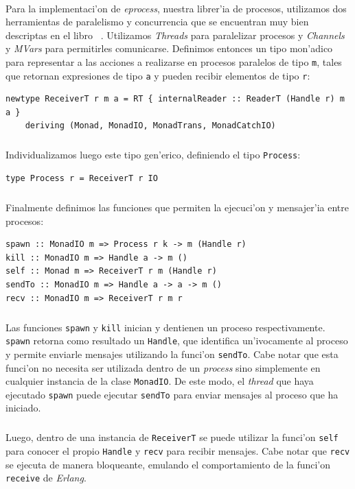 \documentclass[a4paper]{article}
\begin{document}
\paragraph{}Para la implementaci'on de \textsl{eprocess}, nuestra librer'ia de procesos, utilizamos dos herramientas de paralelismo y concurrencia que se encuentran muy bien descriptas en el libro ~\cite{realworldhaskell}.  Utilizamos \textsl{Threads} para paralelizar procesos y \textsl{Channels} y \textsl{MVars} para permitirles comunicarse.  Definimos entonces un tipo mon'adico para representar a las acciones a realizarse en procesos paralelos de tipo \texttt{m}, tales que retornan expresiones de tipo \texttt{a} y pueden recibir elementos de tipo \texttt{r}:
\begin{center}\begin{lstlisting}
newtype ReceiverT r m a = RT { internalReader :: ReaderT (Handle r) m a }
    deriving (Monad, MonadIO, MonadTrans, MonadCatchIO)
\end{lstlisting}\end{center}
\subparagraph{}Individualizamos luego este tipo gen'erico, definiendo el tipo \texttt{Process}:
\begin{center}\begin{lstlisting}
type Process r = ReceiverT r IO
\end{lstlisting}\end{center}
\subparagraph{}Finalmente definimos las funciones que permiten la ejecuci'on y mensajer'ia entre procesos:
\begin{center}\begin{lstlisting}
spawn :: MonadIO m => Process r k -> m (Handle r)
kill :: MonadIO m => Handle a -> m ()
self :: Monad m => ReceiverT r m (Handle r)
sendTo :: MonadIO m => Handle a -> a -> m ()
recv :: MonadIO m => ReceiverT r m r
\end{lstlisting}\end{center}
\subparagraph{}Las funciones \texttt{spawn} y \texttt{kill} inician y dentienen un proceso respectivamente.  \texttt{spawn} retorna como resultado un \texttt{Handle}, que identifica un'ivocamente al proceso y permite enviarle mensajes utilizando la funci'on \texttt{sendTo}.  Cabe notar que esta funci'on no necesita ser utilizada dentro de un \textsl{process} sino simplemente en cualquier instancia de la clase \texttt{MonadIO}.  De este modo, el \textsl{thread} que haya ejecutado \texttt{spawn} puede ejecutar \texttt{sendTo} para enviar mensajes al proceso que ha iniciado.
\subparagraph{}Luego, dentro de una instancia de \texttt{ReceiverT} se puede utilizar la funci'on \texttt{self} para conocer el propio \texttt{Handle} y \texttt{recv} para recibir mensajes.  Cabe notar que \texttt{recv} se ejecuta de manera bloqueante, emulando el comportamiento de la funci'on \texttt{receive} de \textsl{Erlang}.
\end{document}
